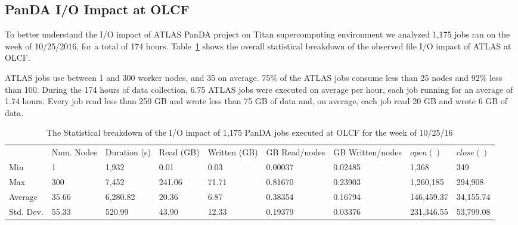 

\subsection{PanDA I/O Impact at OLCF}

To better understand the I/O impact of ATLAS PanDA project on Titan
supercomputing environment we analyzed 1,175 jobs ran on the week of 10/25/2016,
for a total of 174 hours. Table~\ref{panda-olcf-stats} shows the overall
statistical breakdown of the observed file I/O impact of ATLAS at OLCF\@.
%

ATLAS jobs use between 1 and 300 worker nodes, and 35 on average. 75\% of the
ATLAS jobs consume less than 25 nodes and 92\% less than 100. During the 174
hours of data collection, 6.75 ATLAS jobs were executed on average per hour,
each job running for an average of 1.74 hours.
Every job read less than 250 GB and wrote less than 75 GB of data and, on
average, each job read 20 GB and wrote 6 GB of data.

\begin{table}[t]
\centering
\begin{tabular}{lllllllll}
 & Num. Nodes & Duration (s) & Read (GB) & Written (GB) & GB Read/nodes & GB Written/nodes & $open()$ & $close()$ \\
Min & 1 & 1,932 & 0.01 & 0.03 & 0.00037 & 0.02485 & 1,368 & 349 \\
Max & 300 & 7,452 & 241.06 & 71.71 & 0.81670 & 0.23903 & 1,260,185 & 294,908 \\
Average & 35.66 & 6,280.82 & 20.36 & 6.87 & 0.38354 & 0.16794 & 146,459.37 & 34,155.74 \\
Std. Dev. & 55.33 & 520.99 & 43.90 & 12.33 & 0.19379 & 0.03376 & 231,346.55 & 53,799.08
\end{tabular}
\caption{The Statistical breakdown of the I/O impact of 1,175 PanDA jobs executed at OLCF for the week of 10/25/16}
\label{panda-olcf-stats}
\end{table}

